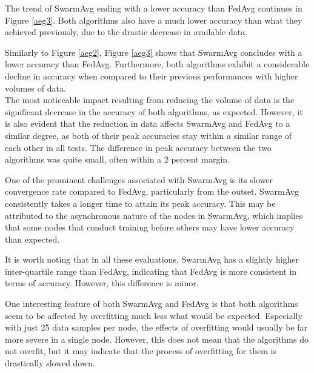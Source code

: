 The trend of SwarmAvg ending with a lower accuracy than FedAvg continues in Figure \ref{aeg3}. Both algorithms also have a much lower accuracy than what they achieved previously, due to the drastic decrease in available data.

Similarly to Figure \ref{aeg2}, Figure \ref{aeg3} shows that SwarmAvg concludes with a lower accuracy than FedAvg. Furthermore, both algorithms exhibit a considerable decline in accuracy when compared to their previous performances with higher volumes of data. \\


The most noticeable impact resulting from reducing the volume of data is the significant decrease in the accuracy of both algorithms, as expected. However, it is also evident that the reduction in data affects SwarmAvg and FedAvg to a similar degree, as both of their peak accuracies stay within a similar range of each other in all tests. The difference in peak accuracy between the two algorithms was quite small, often within a 2 percent margin.

One of the prominent challenges associated with SwarmAvg is its slower convergence rate compared to FedAvg, particularly from the outset. SwarmAvg consistently takes a longer time to attain its peak accuracy. This may be attributed to the asynchronous nature of the nodes in SwarmAvg, which implies that some nodes that conduct training before others may have lower accuracy than expected.

It is worth noting that in all these evaluations, SwarmAvg has a slightly higher inter-quartile range than FedAvg, indicating that FedAvg is more consistent in terms of accuracy. However, this difference is minor.

One interesting feature of both SwarmAvg and FedAvg is that both algorithms seem to be affected by overfitting much less what would be expected. Especially with just 25 data samples per node, the effects of overfitting would usually be far more severe in a single node. However, this does not mean that the algorithms do not overfit, but it may indicate that the process of overfitting for them is drastically slowed down.

